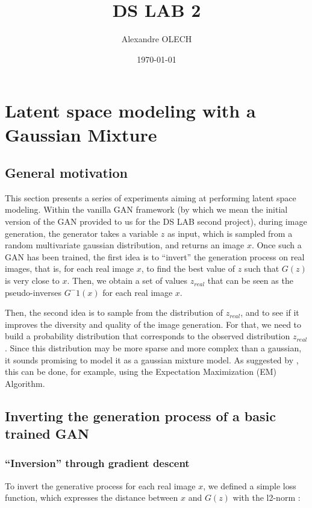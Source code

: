 \documentclass[10pt]{article}
\title{DS LAB 2}
\author{Alexandre OLECH}
\date{\today}
\begin{document}
\maketitle

\section{Latent space modeling with a Gaussian Mixture}
\subsection{General motivation}
This section presents a series of experiments aiming at performing latent space modeling. Within the vanilla GAN framework (by which we mean the initial version of the GAN provided to us for the DS LAB second project), during image generation, the generator takes a variable $z$ as input, which is sampled from a random multivariate gaussian distribution, and returns an image $x$. Once such a GAN has been trained, the first idea is to “invert” the generation process on real images, that is, for each real image $x$, to find the best value of $z$ such that $G(z)$ is very close to $x$. Then, we obtain a set of values $z_{real}$ that can be seen as the pseudo-inverses $G^-1(x)$ for each real image $x$.

Then, the second idea is to sample from the distribution of $z_{real}$, and to see if it improves the diversity and quality of the image generation. For that, we need to build a probability distribution that corresponds to the observed distribution $z_{real}$. Since this distribution may be more sparse and more complex than a gaussian, it sounds promising to model it as a gaussian mixture model. As suggested by \citep{ref_key}, this can be done, for example, using the Expectation Maximization (EM) Algorithm.

\subsection{Inverting the generation process of a basic trained GAN}

\subsubsection{“Inversion” through gradient descent}

To invert the generative process for each real image $x$, we defined a simple loss function, which expresses the distance between $x$ and $G(z)$ with the l2-norm :
\end{document}
